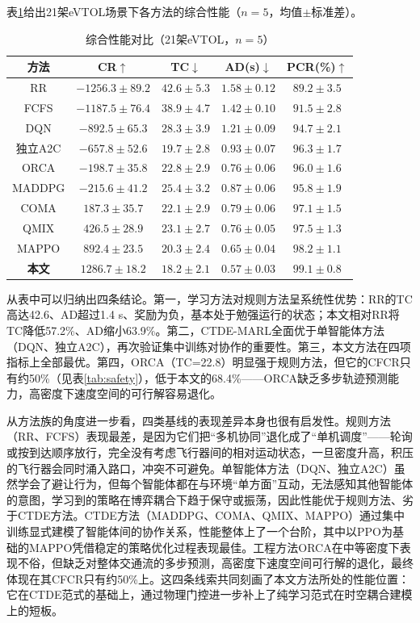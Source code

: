 \documentclass[12pt,a4paper,UTF8]{ctexart}
\begin{document}
表\ref{tab:comparison}给出21架eVTOL场景下各方法的综合性能（$n=5$，均值$\pm$标准差）。

\begin{table}[H]
    \centering
    \caption{综合性能对比（21架eVTOL，$n=5$）}
    \label{tab:comparison}
    \begin{tabular}{ccccc}
        \toprule
        \textbf{方法} & \textbf{CR$\uparrow$} & \textbf{TC$\downarrow$} & \textbf{AD(s)$\downarrow$} & \textbf{PCR(\%)$\uparrow$} \\
        \midrule
        RR & $-1256.3\pm89.2$ & $42.6\pm5.3$ & $1.58\pm0.12$ & $89.2\pm3.5$ \\
        FCFS & $-1187.5\pm76.4$ & $38.9\pm4.7$ & $1.42\pm0.10$ & $91.5\pm2.8$ \\
        DQN & $-892.5\pm65.3$ & $28.3\pm3.9$ & $1.21\pm0.09$ & $94.7\pm2.1$ \\
        独立A2C & $-657.8\pm52.6$ & $19.7\pm2.8$ & $0.93\pm0.07$ & $96.3\pm1.7$ \\
        ORCA & $-198.7\pm35.8$ & $22.8\pm2.9$ & $0.76\pm0.06$ & $96.0\pm1.6$ \\
        MADDPG & $-215.6\pm41.2$ & $25.4\pm3.2$ & $0.87\pm0.06$ & $95.8\pm1.9$ \\
        COMA & $187.3\pm35.7$ & $22.1\pm2.9$ & $0.79\pm0.06$ & $97.1\pm1.5$ \\
        QMIX & $426.5\pm28.9$ & $23.1\pm2.7$ & $0.76\pm0.05$ & $97.5\pm1.3$ \\
        MAPPO & $892.4\pm23.5$ & $20.3\pm2.4$ & $0.65\pm0.04$ & $98.2\pm1.1$ \\
        \textbf{本文} & $\mathbf{1286.7\pm18.2}$ & $\mathbf{18.2\pm2.1}$ & $\mathbf{0.57\pm0.03}$ & $\mathbf{99.1\pm0.8}$ \\
        \bottomrule
    \end{tabular}
\end{table}

从表中可以归纳出四条结论。第一，学习方法对规则方法呈系统性优势：RR的TC高达42.6、AD超过1.4 s、奖励为负，基本处于勉强运行的状态；本文相对RR将TC降低57.2\%、AD缩小63.9\%。第二，CTDE-MARL全面优于单智能体方法（DQN、独立A2C），再次验证集中训练对协作的重要性。第三，本文方法在四项指标上全部最优。第四，ORCA（TC=22.8）明显强于规则方法，但它的CFCR只有约50\%（见表\ref{tab:safety}），低于本文的68.4\%——ORCA缺乏多步轨迹预测能力，高密度下速度空间的可行解容易退化。

从方法族的角度进一步看，四类基线的表现差异本身也很有启发性。规则方法（RR、FCFS）表现最差，是因为它们把“多机协同”退化成了“单机调度”——轮询或按到达顺序放行，完全没有考虑飞行器间的相对运动状态，一旦密度升高，积压的飞行器会同时涌入路口，冲突不可避免。单智能体方法（DQN、独立A2C）虽然学会了避让行为，但每个智能体都在与环境“单方面”互动，无法感知其他智能体的意图，学习到的策略在博弈耦合下趋于保守或振荡，因此性能优于规则方法、劣于CTDE方法。CTDE方法（MADDPG、COMA、QMIX、MAPPO）通过集中训练显式建模了智能体间的协作关系，性能整体上了一个台阶，其中以PPO为基础的MAPPO凭借稳定的策略优化过程表现最佳。工程方法ORCA在中等密度下表现不俗，但缺乏对整体交通流的多步预测，高密度下速度空间可行解的退化，最终体现在其CFCR只有约50\%上。这四条线索共同刻画了本文方法所处的性能位置：它在CTDE范式的基础上，通过物理门控进一步补上了纯学习范式在时空耦合建模上的短板。
\end{document}
